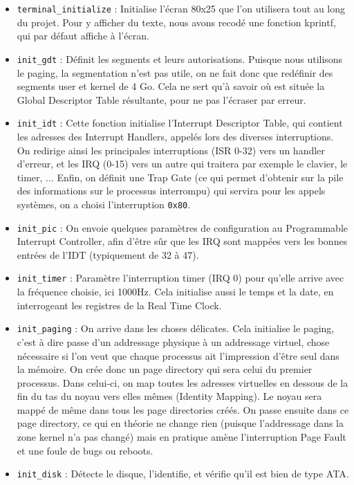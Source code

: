 \documentclass[a4paper,10pt, french]{article}
\newcommand{\code}[1]{\texttt{#1}}
\begin{document}
\begin{itemize}
 \item \code{terminal\_initialize} : Initialise l'écran 80x25 que l'on utilisera tout au long du projet.
 Pour y afficher du texte, nous avons recodé une fonction kprintf, qui par défaut affiche à l'écran.
 \item \code{init\_gdt} : Définit les segments et leurs autorisations. Puisque nous utilisons le paging, 
 la segmentation n'est pas utile, on ne fait donc que redéfinir des segments user et kernel de 4 Go. Cela ne
 sert qu'à savoir où est située la Global Descriptor Table résultante, pour ne pas l'écraser par erreur.
 \item \code{init\_idt} : Cette fonction initialise l'Interrupt Descriptor Table, qui contient les adresses
 des Interrupt Handlers, appelés lors des diverses interruptions. On redirige ainsi les principales interruptions
 (ISR 0-32) vers un handler d'erreur, et les IRQ (0-15) vers un autre qui traitera par exemple le clavier, 
 le timer, ... Enfin, on définit une Trap Gate (ce qui permet d'obtenir sur la pile des informations sur le 
 processus interrompu) qui servira pour les appels systèmes, on a choisi l'interruption \code{0x80}.
 \item \code{init\_pic} : On envoie quelques paramètres de configuration au Programmable Interrupt Controller,
 afin d'être sûr que les IRQ sont mappées vers les bonnes entrées de l'IDT (typiquement de 32 à 47).
 \item \code{init\_timer} : Paramètre l'interruption timer (IRQ 0) pour qu'elle arrive avec la fréquence choisie, ici 1000Hz.
 Cela initialise aussi le temps et la date, en interrogeant les registres de la Real Time Clock.
 \item \code{init\_paging} : On arrive dans les choses délicates. Cela initialise le paging, c'est à dire 
 passe d'un addressage physique à un addressage virtuel, chose nécessaire si l'on veut que chaque processus ait l'impression
 d'être seul dans la mémoire. On crée donc un page directory qui sera celui du premier processus. Dans celui-ci, on 
 map toutes les adresses virtuelles en dessous de la fin du tas du noyau vers elles mêmes (Identity Mapping).
 Le noyau sera mappé de même dans tous les page directories créés. On passe ensuite dans ce page directory, ce qui
 en théorie ne change rien (puisque l'addressage dans la zone kernel n'a pas changé) mais en pratique amène l'interruption Page Fault
 et une foule de bugs ou reboots.
 \item \code{init\_disk} : Détecte le disque, l'identifie, et vérifie qu'il est bien de type ATA.

\end{itemize}
\end{document}
